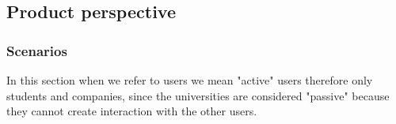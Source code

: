 
\subsection{Product perspective}

    \subsubsection{Scenarios}

    In this section when we refer to users we mean "active" users therefore only students and companies, since the universities are considered "passive" because they cannot create interaction with the other users. 
    
